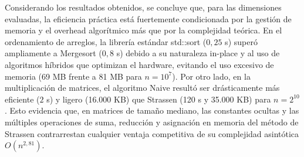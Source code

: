 Considerando los resultados obtenidos, se concluye que, para las dimensiones evaluadas, la eficiencia práctica está fuertemente condicionada por la gestión de memoria y el overhead algorítmico más que por la complejidad teórica. En el ordenamiento de arreglos, la librería estándar std::sort ($0,25$ s) superó ampliamente a Mergesort ($0,8$ s) debido a su naturaleza in-place y al uso de algoritmos híbridos que optimizan el hardware, evitando el uso excesivo de memoria (69 MB frente a 81 MB para $n = 10^7$). Por otro lado, en la multiplicación de matrices, el algoritmo Naive resultó ser drásticamente más eficiente ($2$ s) y ligero (16.000 KB) que Strassen (120 s y 35.000 KB) para $n = 2^{10}$. Esto evidencia que, en matrices de tamaño mediano, las constantes ocultas y las múltiples operaciones de suma, reducción y asignación en memoria del método de Strassen contrarrestan cualquier ventaja competitiva de su complejidad asintótica $O(n^{2,81})$.
